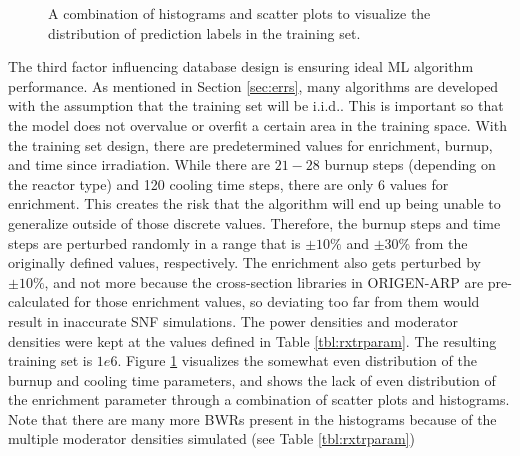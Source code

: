 \begin{figure}[!hbt]
  \caption{A combination of histograms and scatter plots to visualize the 
           distribution of prediction labels in the training set.}
  \label{fig:trainhist}
\end{figure}

The third factor influencing database design is ensuring ideal \gls{ML}
algorithm performance.  As mentioned in Section \ref{sec:errs}, many algorithms
are developed with the assumption that the training set will be
\acrfull{i.i.d.}.  This is important so that the model does not overvalue or
overfit a certain area in the training space. With the training set design,
there are predetermined values for enrichment, burnup, and time since
irradiation.  While there are $21-28$ burnup steps (depending on the reactor
type) and 120 cooling time steps, there are only 6 values for enrichment. This
creates the risk that the algorithm will end up being unable to generalize
outside of those discrete values. Therefore, the burnup steps and time steps
are perturbed randomly in a range that is $\pm10\%$ and $\pm30\%$ from the
originally defined values, respectively.  The enrichment also gets perturbed by
$\pm10\%$, and not more because the cross-section libraries in \gls{ORIGEN-ARP}
are pre-calculated for those enrichment values, so deviating too far from them
would result in inaccurate \gls{SNF} simulations. The power densities and
moderator densities were kept at the values defined in Table
\ref{tbl:rxtrparam}.  The resulting training set is $1e6$.  Figure
\ref{fig:trainhist} visualizes the somewhat even distribution of the burnup and
cooling time parameters, and shows the lack of even distribution of the
enrichment parameter through a combination of scatter plots and histograms.
Note that there are many more \gls{BWR}s present in the histograms because of
the multiple moderator densities simulated (see Table \ref{tbl:rxtrparam})

